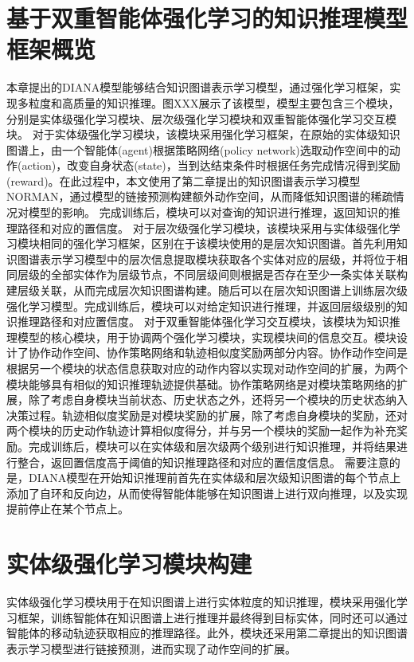 \documentclass[algorithmlist, AutoFakeBold, AutoFakeSlant, figurelist, tablelist, nomlist, masters]{seuthesix}
\begin{document}
\section{基于双重智能体强化学习的知识推理模型框架概览}
本章提出的DIANA模型能够结合知识图谱表示学习模型，通过强化学习框架，实现多粒度和高质量的知识推理。图XXX展示了该模型，模型主要包含三个模块，分别是实体级强化学习模块、层次级强化学习模块和双重智能体强化学习交互模块。
对于实体级强化学习模块，该模块采用强化学习框架，在原始的实体级知识图谱上，由一个智能体(agent)根据策略网络(policy network)选取动作空间中的动作(action)，改变自身状态(state)，当到达结束条件时根据任务完成情况得到奖励(reward)。在此过程中，本文使用了第二章提出的知识图谱表示学习模型NORMAN，通过模型的链接预测构建额外动作空间，从而降低知识图谱的稀疏情况对模型的影响。
完成训练后，模块可以对查询的知识进行推理，返回知识的推理路径和对应的置信度。
对于层次级强化学习模块，该模块采用与实体级强化学习模块相同的强化学习框架，区别在于该模块使用的是层次知识图谱。首先利用知识图谱表示学习模型中的层次信息提取模块获取各个实体对应的层级，并将位于相同层级的全部实体作为层级节点，不同层级间则根据是否存在至少一条实体关联构建层级关联，从而完成层次知识图谱构建。随后可以在层次知识图谱上训练层次级强化学习模型。完成训练后，模块可以对给定知识进行推理，并返回层级级别的知识推理路径和对应置信度。
对于双重智能体强化学习交互模块，该模块为知识推理模型的核心模块，用于协调两个强化学习模块，实现模块间的信息交互。模块设计了协作动作空间、协作策略网络和轨迹相似度奖励两部分内容。协作动作空间是根据另一个模块的状态信息获取对应的动作内容以实现对动作空间的扩展，为两个模块能够具有相似的知识推理轨迹提供基础。协作策略网络是对模块策略网络的扩展，除了考虑自身模块当前状态、历史状态之外，还将另一个模块的历史状态纳入决策过程。轨迹相似度奖励是对模块奖励的扩展，除了考虑自身模块的奖励，还对两个模块的历史动作轨迹计算相似度得分，并与另一个模块的奖励一起作为补充奖励。完成训练后，模块可以在实体级和层次级两个级别进行知识推理，并将结果进行整合，返回置信度高于阈值的知识推理路径和对应的置信度信息。
需要注意的是，DIANA模型在开始知识推理前首先在实体级和层次级知识图谱的每个节点上添加了自环和反向边，从而使得智能体能够在知识图谱上进行双向推理，以及实现提前停止在某个节点上。

\section{实体级强化学习模块构建}
实体级强化学习模块用于在知识图谱上进行实体粒度的知识推理，模块采用强化学习框架，训练智能体在知识图谱上进行推理并最终得到目标实体，同时还可以通过智能体的移动轨迹获取相应的推理路径。此外，模块还采用第二章提出的知识图谱表示学习模型进行链接预测，进而实现了动作空间的扩展。
\end{document}
